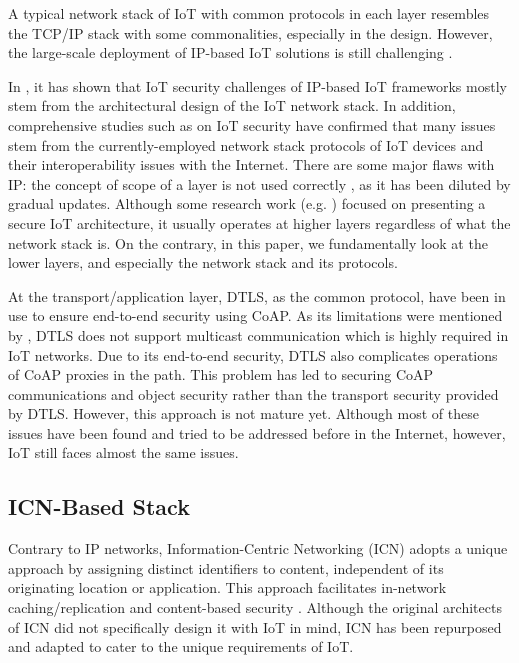 \documentclass{ieeeaccess}
\begin{document}
A typical network stack of IoT with common protocols in each layer resembles the TCP/IP stack with some commonalities, especially in the design. However, the large-scale deployment of IP-based IoT solutions is still challenging \cite{amadeo2016information}. 

In \cite{ramezanifarkhani2018securing}, it has shown that IoT security challenges of IP-based IoT frameworks mostly stem from the architectural design of the IoT network stack. In addition, comprehensive studies such as \cite{yang2017survey} on IoT security have confirmed that many issues stem from the currently-employed network stack protocols of IoT devices and their interoperability issues with the Internet. There are some major flaws with IP: the concept of scope of a layer is not used correctly \cite{day2008networking}, as it has been diluted by gradual updates. Although some research work (e.g. \cite{suarez2016secure}) focused on presenting a secure IoT architecture, it usually operates at higher layers regardless of what the network stack is. On the contrary, in this paper, we fundamentally look at the lower layers, and especially the network stack and its protocols.

At the transport/application layer, DTLS, as the common protocol, have been in use to ensure end-to-end security using CoAP. As its limitations were mentioned by \cite{grammatikis2019securing,7005393}, DTLS does not support multicast communication which is highly required in IoT networks. Due to its end-to-end security, DTLS also complicates operations of CoAP proxies in the path. This problem has led to securing CoAP communications and object security rather than the transport security provided by DTLS. However, this approach is not mature yet.
Although most of these issues have been found and tried to be addressed before in the Internet, however, IoT still faces almost the same issues.


\subsection{ICN-Based Stack}

Contrary to IP networks, Information-Centric Networking (ICN) adopts a unique approach by assigning distinct identifiers to content, independent of its originating location or application. This approach facilitates in-network caching/replication and content-based security \cite{amadeo2016information}. Although the original architects of ICN did not specifically design it with IoT in mind, ICN has been repurposed and adapted to cater to the unique requirements of IoT.
\end{document}

